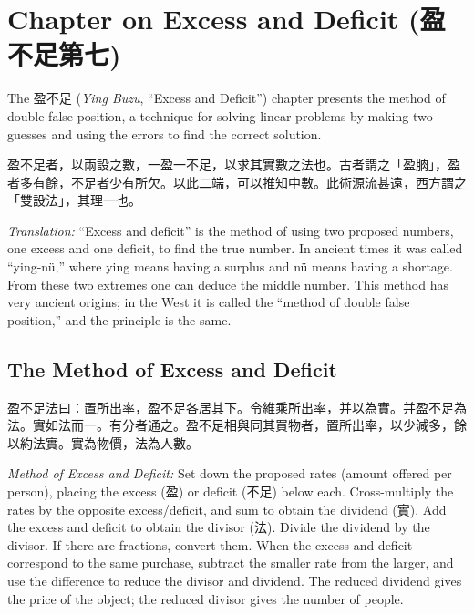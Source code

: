 \documentclass[11pt,a4paper]{article}
\newcommand{\zh}[1]{{#1}}
\newenvironment{chpassage}{%
  \par\medskip
  \begin{center}
  \begin{minipage}{0.95\textwidth}
  \setlength{\parindent}{2em}
  \linespread{1.3}\selectfont
}{%
  \end{minipage}
  \end{center}
  \medskip
}
\begin{document}
\newpage

\section{Chapter on Excess and Deficit (\zh{盈不足第七})}
\label{sec:yingbuzu}

The \zh{盈不足} (\textit{Ying Buzu}, ``Excess and Deficit'') chapter
presents the method of double false position, a technique for solving linear
problems by making two guesses and using the errors to find the correct
solution.

\begin{chpassage}
\zh{盈不足者，以兩設之數，一盈一不足，以求其實數之法也。古者謂之「盈朒」，盈者多有餘，不足者少有所欠。以此二端，可以推知中數。此術源流甚遠，西方謂之「雙設法」，其理一也。}

\medskip
\textit{Translation:} ``Excess and deficit'' is the method of using two
proposed numbers, one excess and one deficit, to find the true number. In
ancient times it was called ``ying-nü,'' where ying means having a surplus and
nü means having a shortage. From these two extremes one can deduce the middle
number. This method has very ancient origins; in the West it is called the
``method of double false position,'' and the principle is the same.
\end{chpassage}

\subsection{The Method of Excess and Deficit}

\begin{chpassage}
\zh{盈不足法曰：置所出率，盈不足各居其下。令維乘所出率，并以為實。并盈不足為法。實如法而一。有分者通之。盈不足相與同其買物者，置所出率，以少減多，餘以約法實。實為物價，法為人數。}

\medskip
\textit{Method of Excess and Deficit:} Set down the proposed rates (amount
offered per person), placing the excess (\zh{盈}) or deficit (\zh{不足})
below each. Cross-multiply the rates by the opposite excess/deficit, and sum
to obtain the dividend (\zh{實}). Add the excess and deficit to obtain the
divisor (\zh{法}). Divide the dividend by the divisor. If there are
fractions, convert them. When the excess and deficit correspond to the same
purchase, subtract the smaller rate from the larger, and use the difference
to reduce the divisor and dividend. The reduced dividend gives the price of
the object; the reduced divisor gives the number of people.
\end{chpassage}
\end{document}
